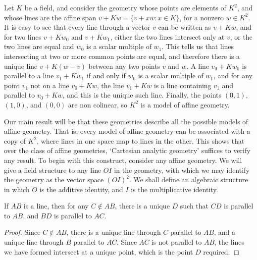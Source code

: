 \begin{example}
    Let $K$ be a field, and consider the geometry whose points are elements of $K^2$, and whose lines are the affine span $v + Kw = \{ v + xw : x \in K \}$, for a nonzero $w \in K^2$. It is easy to see that every line through a vector $v$ can be written as $v + Kw$, and for two lines $v + Kw_0$ and $v + Kw_1$, either the two lines intersect only at $v$, or the two lines are equal and $w_0$ is a scalar multiple of $w_1$. This tells us that lines intersecting at two or more common points are equal, and therefore there is a unique line $v + K(w-v)$ between any two points $v$ and $w$. A line $v_0 + Kw_0$ is parallel to a line $v_1 + Kw_1$ if and only if $w_0$ is a scalar multiple of $w_1$, and for any point $v_1$ not on a line $v_0 + Kw$, the line $v_1 + Kw$ is a line containing $v_1$ and parallel to $v_0 + Kw$, and this is the unique such line. Finally, the points $(0,1)$, $(1,0)$, and $(0,0)$ are non colinear, so $K^2$ is a model of affine geometry.
\end{example}

Our main result will be that these geometries describe all the possible models of affine geometry. That is, every model of affine geometry can be associated with a copy of $K^2$, where lines in one space map to lines in the other. This shows that over the class of affine geometries, `Cartesian analytic geometry' suffices to verify any result. To begin with this construct, consider any affine geometry. We will give a field structure to any line $OI$ in the geometry, with which we may identify the geometry as the vector space $(OI)^2$. We shall define an algebraic structure in which $O$ is the additive identity, and $I$ is the multiplicative identity.

\begin{center}
\end{center}

\begin{lemma}
    If $AB$ is a line, then for any $C \not \in AB$, there is a unique $D$ such that $CD$ is parallel to $AB$, and $BD$ is parallel to $AC$.
\end{lemma}
\begin{proof}
    Since $C \not \in AB$, there is a unique line through $C$ parallel to $AB$, and a unique line through $B$ parallel to $AC$. Since $AC$ is not parallel to $AB$, the lines we have formed intersect at a unique point, which is the point $D$ required.
\end{proof}

